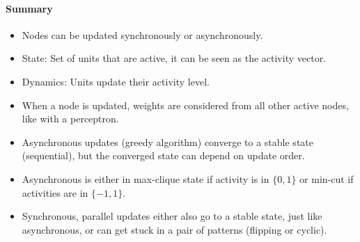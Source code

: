 \documentclass[main]{subfiles}
\begin{document}
\paragraph{Summary}
\begin{itemize}[noitemsep,nolistsep]
	\item Nodes can be updated synchronously or asynchronously.
	\item State: Set of units that are active, it can be seen as the activity vector.
	\item Dynamics: Units update their activity level.
	\item When a node is updated, weights are considered from all other active nodes, like with a perceptron.
	\item Asynchronous updates (greedy algorithm) converge to a stable state (sequential), but the converged state can depend on update order.
	\item Asynchronous is either in max-clique state if activity is in $\{0,1\}$ or min-cut if activities are in $\{-1,1\}$.
	\item Synchronous, parallel updates either also go to a stable state, just like asynchronous, or can get stuck in a pair of patterns (flipping or cyclic).
\end{itemize}
\end{document}
